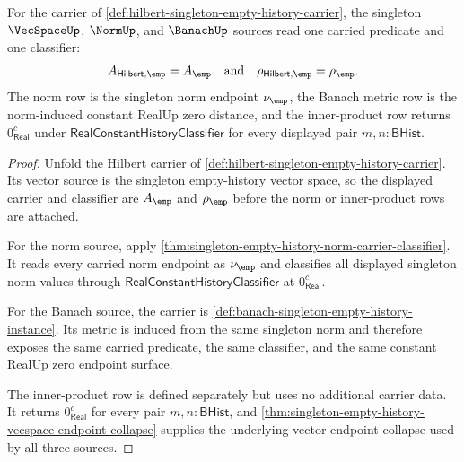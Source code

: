 \begin{theorem}
\label{thm:hilbert-singleton-source-compatibility}
For the carrier of
\autoref{def:hilbert-singleton-empty-history-carrier}, the singleton
$\VecSpaceUp$, $\NormUp$, and $\BanachUp$ sources read one carried predicate
and one classifier:
$$
A_{\mathsf{Hilbert},\emp}=A_{\emp}
\quad\text{and}\quad
\rho_{\mathsf{Hilbert},\emp}=\rho_{\emp}.
$$
The norm row is the singleton norm endpoint $\nu_{\emp}$, the Banach metric
row is the norm-induced constant RealUp zero distance, and the inner-product
row returns $0_{\mathsf{Real}}^{c}$ under
$\mathsf{RealConstantHistoryClassifier}$ for every displayed pair
$m,n:\mathsf{BHist}$.
\end{theorem}
\begin{proof}
Unfold the Hilbert carrier of
\autoref{def:hilbert-singleton-empty-history-carrier}. Its vector source is
the singleton empty-history vector space, so the displayed carrier and
classifier are $A_{\emp}$ and $\rho_{\emp}$ before the norm or inner-product
rows are attached.

For the norm source, apply
\autoref{thm:singleton-empty-history-norm-carrier-classifier}. It reads every
carried norm endpoint as $\nu_{\emp}$ and classifies all displayed singleton
norm values through $\mathsf{RealConstantHistoryClassifier}$ at
$0_{\mathsf{Real}}^{c}$.

For the Banach source, the carrier is
\autoref{def:banach-singleton-empty-history-instance}. Its metric is induced
from the same singleton norm and therefore exposes the same carried predicate,
the same classifier, and the same constant RealUp zero endpoint surface.

The inner-product row is defined separately but uses no additional carrier
data. It returns $0_{\mathsf{Real}}^{c}$ for every pair
$m,n:\mathsf{BHist}$, and
\autoref{thm:singleton-empty-history-vecspace-endpoint-collapse} supplies the
underlying vector endpoint collapse used by all three sources.
\end{proof}

